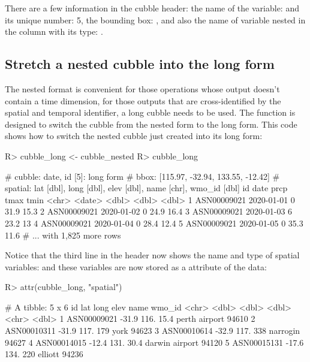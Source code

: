 \documentclass[
]{jss}
\begin{document}
There are a few information in the cubble header: the name of the
 variable:  and its unique number: 5, the bounding
box: \code{[115.97, -32.94, 133.55, -12.42]} , and also the name of
variable nested in the  column with its type:
.

\hypertarget{stretch-a-nested-cubble-into-the-long-form}{%
\subsection{Stretch a nested cubble into the long
form}\label{stretch-a-nested-cubble-into-the-long-form}}

The nested format is convenient for those operations whose output
doesn't contain a time dimension, for those outputs that are
cross-identified by the spatial and temporal identifier, a long cubble
needs to be used. The function  is designed to switch
the cubble from the nested form to the long form. This code shows how to
switch the nested cubble just created into its long form:

\begin{CodeChunk}
\begin{CodeInput}
R> cubble_long <- cubble_nested %
R> cubble_long
\end{CodeInput}
\begin{CodeOutput}
# cubble:  date, id [5]: long form
# bbox:    [115.97, -32.94, 133.55, -12.42]
# spatial: lat [dbl], long [dbl], elev [dbl], name [chr], wmo_id [dbl]
  id          date        prcp  tmax  tmin
  <chr>       <date>     <dbl> <dbl> <dbl>
1 ASN00009021 2020-01-01     0  31.9  15.3
2 ASN00009021 2020-01-02     0  24.9  16.4
3 ASN00009021 2020-01-03     6  23.2  13  
4 ASN00009021 2020-01-04     0  28.4  12.4
5 ASN00009021 2020-01-05     0  35.3  11.6
# ... with 1,825 more rows
\end{CodeOutput}
\end{CodeChunk}

Notice that the third line in the header now shows the name and type of
spatial variables:
 and
these variables are now stored as a  attribute of the
data:

\begin{CodeChunk}
\begin{CodeInput}
R> attr(cubble_long, "spatial")
\end{CodeInput}
\begin{CodeOutput}
# A tibble: 5 x 6
  id            lat  long  elev name           wmo_id
  <chr>       <dbl> <dbl> <dbl> <chr>           <dbl>
1 ASN00009021 -31.9  116.  15.4 perth airport   94610
2 ASN00010311 -31.9  117. 179   york            94623
3 ASN00010614 -32.9  117. 338   narrogin        94627
4 ASN00014015 -12.4  131.  30.4 darwin airport  94120
5 ASN00015131 -17.6  134. 220   elliott         94236
\end{CodeOutput}
\end{CodeChunk}
\end{document}

